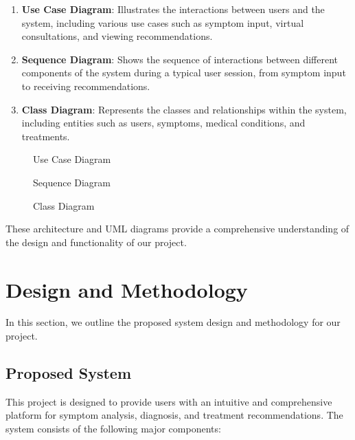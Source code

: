 \documentclass[onecolumn]{article}
\begin{document}
\begin{enumerate}
\item \textbf{Use Case Diagram}: Illustrates the interactions between users and the system, including various use cases such as symptom input, virtual consultations, and viewing recommendations.
\item \textbf{Sequence Diagram}: Shows the sequence of interactions between different components of the system during a typical user session, from symptom input to receiving recommendations.
\item \textbf{Class Diagram}: Represents the classes and relationships within the system, including entities such as users, symptoms, medical conditions, and treatments.
\end{enumerate}

\newpage

\begin{figure}[ht]
\centering
\caption{Use Case Diagram}\label{fig:use_case_diagram}
\end{figure}

\begin{figure}[ht]
\centering
\caption{Sequence Diagram}\label{fig:sequence_diagram}
\end{figure}

\begin{figure}[ht]
\centering
\caption{Class Diagram}\label{fig:class_diagram}
\end{figure}

These architecture and UML diagrams provide a comprehensive understanding of the design and functionality of our project.

\section{Design and Methodology}
In this section, we outline the proposed system design and methodology for our project.

\subsection{Proposed System}
This project is designed to provide users with an intuitive and comprehensive platform for symptom analysis, diagnosis, and treatment recommendations. The system consists of the following major components:
\end{document}
